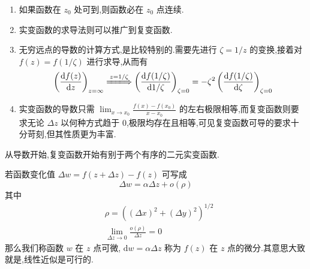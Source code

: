 \documentclass[UTF8]{ctexbook}
\newcommand{\D}{\text{d}}
\newcommand{\derivative}[2]{\frac{\D #1}{\D #2}}
\begin{document}
\begin{enumerate}
    \item 如果函数在 $z_0$ 处可到,则函数必在 $z_0$ 点连续.
    \item 实变函数的求导法则可以推广到复变函数.
    \item 无穷远点的导数的计算方式,是比较特别的.需要先进行 $\zeta = 1/z$ 的变换,接着对 $f(z)=f(1/\zeta)$ 进行求导,从而有
    \[
    \left( \derivative{f(z)}{z} \right)_{z=\infty} \xLongrightarrow{z=1/\zeta} \left( \derivative{f(1/\zeta)}{1/\zeta} \right)_{\zeta=0} = -\zeta^2\left( \derivative{f(1/\zeta)}{\zeta} \right)_{\zeta=0}
    \]
    \item 实变函数的导数只需 $\displaystyle\lim_{x\to x_0}\frac{f(x)-f(x_0)}{x-x_0}$ 的左右极限相等,而复变函数则要求无论 $\Delta z$ 以何种方式趋于 0,极限均存在且相等,可见复变函数可导的要求十分苛刻,但其性质更为丰富.
\end{enumerate}

从导数开始,复变函数开始有别于两个有序的二元实变函数.

\begin{definition}
    若函数变化值 $\Delta w=f(z+\Delta z)-f(z)$ 可写成
    \[
        \Delta w=\alpha\Delta z+o(\rho)
    \]
    其中
    \begin{align*}
        &\rho=\left( (\Delta x)^2+(\Delta y)^2 \right)^{1/2} \\
        &\lim_{\Delta z\to 0}\frac{o(\rho)}{\Delta z}=0
    \end{align*}
    那么我们称函数 $w$ 在 $z$ 点可微, $\D w=\alpha\Delta z$ 称为 $f(z)$ 在 $z$ 点的微分.其意思大致就是,线性近似是可行的.
\end{definition}
\end{document}
